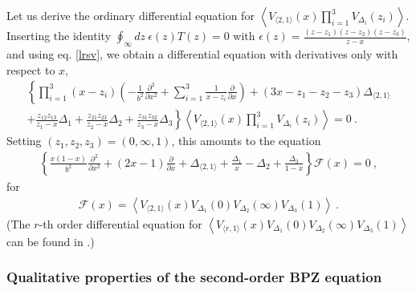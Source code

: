 \documentclass[12pt, a4paper, notitlepage, twoside]{report}
\numberwithin{equation}{section}
\theoremstyle{break}
\begin{document}
Let us derive the ordinary differential equation for $\left\langle V_{\langle 2,1 \rangle}(x)\prod_{i=1}^3 V_{\Delta_i}(z_i)\right\rangle$.
Inserting the identity $\oint_\infty dz\ \epsilon(z) T(z) =0$ with $\epsilon(z) = \frac{(z-z_1)(z-z_2)(z-z_3)}{z-x}$, and using eq. \eqref{lrsv}, we obtain a differential equation with derivatives only with respect to $x$, 
\begin{multline}
  \left\{ \prod_{i=1}^3(x-z_i)\left(-\frac{1}{b^2}\frac{\partial^2}{\partial x^2} +\sum_{i=1}^3 \frac{1}{x-z_i} {\frac{\partial}{\partial x}} \right) + (3x-z_1-z_2-z_3)\Delta_{\langle 2,1 \rangle} \right.
  \\
\left.  +\frac{z_{12}z_{13}}{z_1-x}\Delta_1 + \frac{z_{21}z_{23}}{z_2-x}\Delta_2+\frac{z_{31}z_{32}}{z_3-x}\Delta_3\right\} 
\left\langle V_{\langle 2,1 \rangle}(x)\prod_{i=1}^3 V_{\Delta_i}(z_i)\right\rangle  = 0\ .
\label{uode}
\end{multline}
Setting $(z_1,z_2,z_3)=(0,\infty,1)$, this amounts to the equation 
\begin{align}
  \left\{ \frac{x(1-x)}{b^2}\frac{\partial^2}{\partial x^2} + (2x-1){\frac{\partial}{\partial x}} +\Delta_{\langle 2,1 \rangle} +\frac{\Delta_1}{x}-\Delta_2 + \frac{\Delta_3}{1-x}\right\} \mathcal{F}(x)=0\ ,
\label{sode}
\end{align}
for 
\begin{align}
 \mathcal{F}(x) = \left\langle V_{\langle 2,1 \rangle}(x)V_{\Delta_1}(0)V_{\Delta_2}(\infty)V_{\Delta_3}(1)\right\rangle\ .
\label{fxv}
 \end{align}
(The $r$-th order differential equation for $\left\langle V_{\langle r,1 \rangle}(x)V_{\Delta_1}(0)V_{\Delta_2}(\infty)V_{\Delta_3}(1)\right\rangle $ can be found in \cite{flno09}.)

\subsubsection{Qualitative properties of the second-order BPZ equation}
\end{document}
